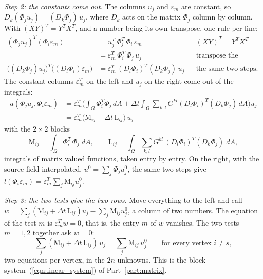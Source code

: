 \emph{Step 2: the constants come out.} The columns $u_j$ and $\varepsilon_m$ are constant, so $D_k(\Phi_ju_j) = (D_k\Phi_j)\,u_j$, where $D_k$ acts on the matrix $\Phi_j$ column by column. With $(XY)^T = Y^TX^T$, and a number being its own transpose, one rule per line:
\begin{align*}
(\Phi_ju_j)^T(\Phi_i\varepsilon_m) &= u_j^T\,\Phi_j^T\,\Phi_i\,\varepsilon_m && (XY)^T = Y^TX^T \\
&= \varepsilon_m^T\,\Phi_i^T\,\Phi_j\,u_j && \text{transpose the number,} \\
\big((D_k\Phi_j)u_j\big)^T\big((D_l\Phi_i)\varepsilon_m\big) &= \varepsilon_m^T\,(D_l\Phi_i)^T(D_k\Phi_j)\,u_j && \text{the same two steps.}
\end{align*}
The constant columns $\varepsilon_m^T$ on the left and $u_j$ on the right come out of the integrals:
\begin{equation*}
\begin{aligned}
a(\Phi_ju_j, \Phi_i\varepsilon_m) &= \varepsilon_m^T\Big(\int_\Omega \Phi_i^T\Phi_j\,dA + \Delta t\int_\Omega\sum_{k,l}G^{kl}(D_l\Phi_i)^T(D_k\Phi_j)\,dA\Big)u_j \\
&= \varepsilon_m^T\big(\mathrm M_{ij} + \Delta t\,\mathrm L_{ij}\big)\,u_j
\end{aligned}
\end{equation*}
with the $2\times 2$ blocks
\begin{equation}
\label{eqn:r3_ML}
\mathrm M_{ij} = \int_\Omega \Phi_i^T\,\Phi_j\; dA, \qquad \mathrm L_{ij} = \int_\Omega \sum_{k,l} G^{kl}\, (D_l\Phi_i)^T(D_k\Phi_j)\; dA ,
\end{equation}
integrals of matrix valued functions, taken entry by entry. On the right, with the source field interpolated, $u^0 = \sum_j \Phi_ju^0_j$, the same two steps give $l(\Phi_i\varepsilon_m) = \varepsilon_m^T\sum_j \mathrm M_{ij}u^0_j$.

\emph{Step 3: the two tests give the two rows.} Move everything to the left and call $w = \sum_j (\mathrm M_{ij} + \Delta t\,\mathrm L_{ij})u_j - \sum_j \mathrm M_{ij}u^0_j$, a column of two numbers. The equation of the test $m$ is $\varepsilon_m^Tw = 0$, that is, the entry $m$ of $w$ vanishes. The two tests $m = 1, 2$ together ask $w = 0$:
\begin{equation*}
\sum_j (\mathrm M_{ij} + \Delta t\, \mathrm L_{ij})\,u_j = \sum_j \mathrm M_{ij}\,u^0_j \qquad \text{for every vertex } i \ne s ,
\end{equation*}
two equations per vertex, in the $2n$ unknowns. This is the block system~(\ref{eqn:linear_system}) of Part~\ref{part:matrix}.

